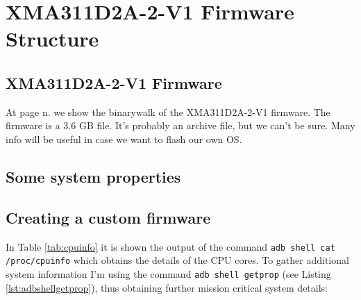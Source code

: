 {\color{teal!90}\chapter{XMA311D2A-2-V1 Firmware Structure}\label{cap:xma311d2a-2-v1}}


\minitoc%


\section{XMA311D2A-2-V1 Firmware}
At page n. \pageref{tab:xma311d2a-2-v1-binwalk} we show the \gls{binarywalk} of the XMA311D2A-2-V1 firmware. The firmware is a 3.6 GB file.
It's probably an archive file, but we can't be sure. Many info will be useful in case we want to
flash our own OS.

\scriptsize
\begin{landscape}

\end{landscape}
\normalsize

\section{Some system properties}
%

\clearpage
\section{Creating a custom firmware}
In Table \ref{tab:cpuinfo} it is shown the output of the command {\color{BrickRed}\texttt{adb shell cat /proc/cpuinfo}} which obtains the details of the CPU cores.
To gather additional system information I'm using the command {\color{BrickRed}\texttt{adb shell getprop}} (see Listing \ref{lst:adbshellgetprop}), thus obtaining further mission critical system details:

